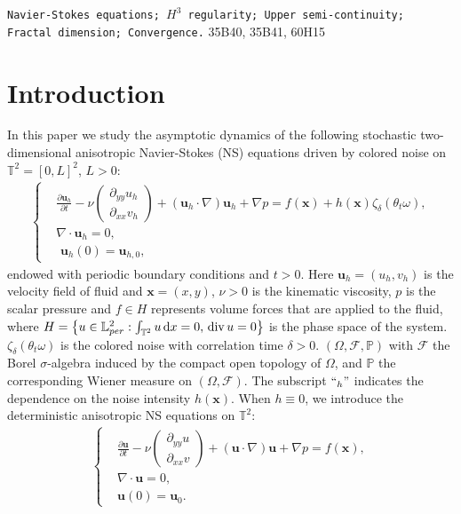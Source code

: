 \documentclass{elsarticle}
\theoremstyle{definition}
\numberwithin{equation}{section}
\newcommand{\LL}{\mathbb{L}_{per}}
\renewcommand{\d}{{\rm{d}}}
\begin{document}
\begin{frontmatter}
\begin{keyword}
\texttt{Navier-Stokes equations;
   $H^3$ regularity;  Upper semi-continuity; Fractal dimension; Convergence.}
\MSC[2020] 35B40, 35B41, 60H15
\end{keyword}
\end{frontmatter}


\tableofcontents

\section{Introduction}

In this  paper we study the asymptotic dynamics of the following stochastic two-dimensional anisotropic Navier-Stokes (NS) equations driven by colored noise  on  $\mathbb{T}^2=[0,L]^2$, $L>0$:
 \begin{align} \label{1}
 \left \{
  \begin{aligned}
 &  \frac{\partial \textbf{u}_h}{\partial t}-  \nu \left(
\begin{array}{ccc}
\partial_{yy}u_h\\ \partial_{xx}v_h
\end{array}\right)+(\textbf{u}_h\cdot\nabla)\textbf{u}_h+\nabla p=  f(\textbf{x}) +h(\textbf{x})\zeta_{\delta}(\theta_t\omega),\\
  & \nabla\cdot \textbf{u}_h=0,\\
  &\textbf{ u}_h(0)=\textbf{u}_{h,0},
  \end{aligned} \right.
\end{align}
 endowed with periodic boundary conditions and $t>0$. Here $\textbf{u}_h=(u_h,v_h)$ is the velocity field of fluid and $\textbf{x}=(x,y)$, $ \nu >0$ is the kinematic viscosity, $p$ is the scalar pressure and $f \in H $  represents volume forces that are applied to the fluid, where $H= \left \{u\in \LL ^2:
  \int_{\mathbb T^2}u \, \d x=0,\,  {\rm div}\, u=0 \right \}$ is the phase space of the system.  $\zeta_{\delta}(\theta_t\omega)$ is the colored noise with correlation time $\delta>0$. $(\Omega,\mathcal{F},\mathbb{P})$ with  $\mathcal{F}$  the Borel $\sigma$-algebra induced by the compact open topology of $\Omega$, and $\mathbb{P}$  the corresponding Wiener measure on $(\Omega,\mathcal{F})$. The subscript $``_{h}"$ indicates the dependence on the noise intensity $h(\textbf{x})$.
When $h\equiv0$, we introduce the deterministic anisotropic  NS equations on  $\mathbb{T}^2$:
 \begin{align}\label{2}
 \left \{
  \begin{aligned}&
   \frac{\partial \textbf{u}}{\partial t}-  \nu \left(
\begin{array}{ccc}
\partial_{yy}u\\ \partial_{xx}v
\end{array}\right)+(\textbf{u}\cdot\nabla)\textbf{u}+\nabla p=f(\textbf{x}),\\
  & \nabla\cdot \textbf{u}=0,\\
   &\textbf{u}(0)=\textbf{u}_{0}.
  \end{aligned} \right.
\end{align}
\end{document}
